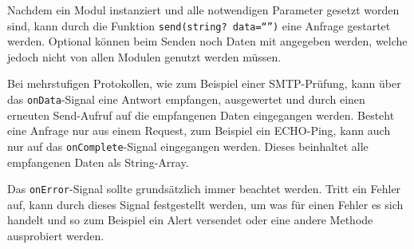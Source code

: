 Nachdem ein Modul instanziert und alle notwendigen Parameter gesetzt worden sind, kann durch die Funktion \texttt{send(string? data="`"')} eine Anfrage gestartet werden. Optional k\"onnen beim Senden noch Daten mit angegeben werden, welche jedoch nicht von allen Modulen genutzt werden m\"ussen.

Bei mehrstufigen Protokollen, wie zum Beispiel einer SMTP-Pr\"ufung, kann \"uber das \texttt{onData}-Signal eine Antwort empfangen, ausgewertet und durch einen erneuten Send-Aufruf auf die empfangenen Daten eingegangen werden. Besteht eine Anfrage nur aus einem Request, zum Beispiel ein ECHO-Ping, kann auch nur auf das \texttt{onComplete}-Signal eingegangen werden. Dieses beinhaltet alle empfangenen Daten als String-Array.

Das \texttt{onError}-Signal sollte grunds\"atzlich immer beachtet werden. Tritt ein Fehler auf, kann durch dieses Signal festgestellt werden, um was f\"ur einen Fehler es sich handelt und so zum Beispiel ein Alert versendet oder eine andere Methode ausprobiert werden.

